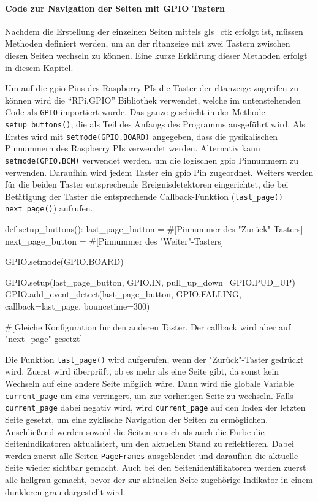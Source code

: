\paragraph{Code zur Navigation der Seiten mit GPIO Tastern} \label{gpio_taster}

Nachdem die Erstellung der einzelnen Seiten mittels \gls{gls_ctk} erfolgt ist, müssen Methoden definiert werden, um an der \acs{rltanzeige} mit zwei Tastern zwischen diesen Seiten wechseln zu können. Eine kurze Erklärung dieser Methoden erfolgt in diesem Kapitel.

Um auf die \ac{gpio} Pins des Raspberry PIs \bzw die Taster der \acs{rltanzeige} zugreifen zu können wird die \enquote{RPi.GPIO} Bibliothek verwendet, welche im untenstehenden Code als \lstinline{GPIO} importiert wurde. Das ganze geschieht in der Methode \lstinline{setup_buttons()}, die als Teil des Anfangs des Programms ausgeführt wird.
Als Erstes wird mit \lstinline{setmode(GPIO.BOARD)} angegeben, dass die pysikalischen Pinnummern des Raspberry PIs verwendet werden. Alternativ kann \lstinline{setmode(GPIO.BCM)} verwendet werden, um die logischen \ac{gpio} Pinnummern zu verwenden. Daraufhin wird jedem Taster ein \ac{gpio} Pin zugeordnet. Weiters werden für die beiden Taster entsprechende Ereignisdetektoren eingerichtet, die bei Betätigung der Taster die entsprechende Callback-Funktion (\lstinline{last_page()} \bzw \lstinline{next_page()}) aufrufen.

\begin{pythoncode}
def setup_buttons():
    last_page_button = #[Pinnummer des "Zurück"-Tasters]
    next_page_button = #[Pinnummer des "Weiter"-Tasters]

    GPIO.setmode(GPIO.BOARD)
    
    GPIO.setup(last_page_button, GPIO.IN, pull_up_down=GPIO.PUD_UP)
    GPIO.add_event_detect(last_page_button, GPIO.FALLING, callback=last_page, bouncetime=300)

    #[Gleiche Konfiguration für den anderen Taster. Der callback wird aber auf "next_page" gesetzt]
\end{pythoncode}

Die Funktion \lstinline{last_page()} wird aufgerufen, wenn der "Zurück"-Taster gedrückt wird. Zuerst wird überprüft, ob es mehr als eine Seite gibt, da sonst kein Wechseln auf eine andere Seite möglich wäre. Dann wird die globale Variable \lstinline{current_page} um eins verringert, um zur vorherigen Seite zu wechseln. Falls \lstinline{current_page} dabei negativ wird, wird \lstinline{current_page} auf den Index der letzten Seite gesetzt, um eine zyklische Navigation der Seiten zu ermöglichen. Anschließend werden sowohl  die Seiten an sich als auch die Farbe die Seitenindikatoren aktualisiert, um den aktuellen Stand zu reflektieren. Dabei werden zuerst alle Seiten \bzw \lstinline{PageFrames} ausgeblendet und daraufhin die aktuelle Seite wieder sichtbar gemacht. Auch bei den Seitenidentifikatoren werden zuerst alle hellgrau gemacht, bevor der zur aktuellen Seite zugehörige Indikator in einem dunkleren grau dargestellt wird.

